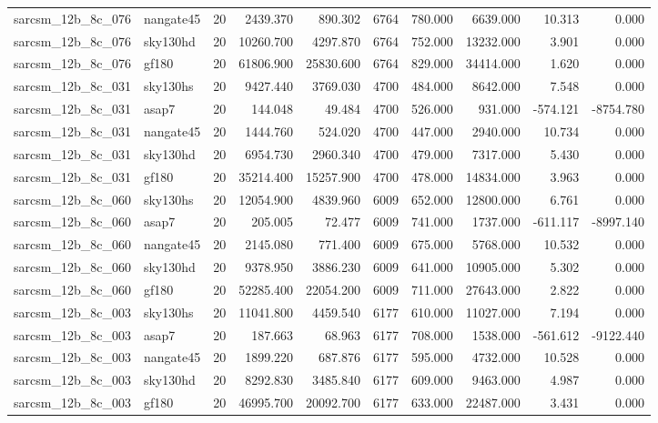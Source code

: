 \documentclass{article}
\begin{document}
\begin{longtable}{llrrrrrrrr}
sarcsm\_12b\_8c\_076 & nangate45 & 20 & 2439.370 & 890.302 & 6764 & 780.000 & 6639.000 & 10.313 & 0.000 \\
sarcsm\_12b\_8c\_076 & sky130hd & 20 & 10260.700 & 4297.870 & 6764 & 752.000 & 13232.000 & 3.901 & 0.000 \\
sarcsm\_12b\_8c\_076 & gf180 & 20 & 61806.900 & 25830.600 & 6764 & 829.000 & 34414.000 & 1.620 & 0.000 \\
sarcsm\_12b\_8c\_031 & sky130hs & 20 & 9427.440 & 3769.030 & 4700 & 484.000 & 8642.000 & 7.548 & 0.000 \\
sarcsm\_12b\_8c\_031 & asap7 & 20 & 144.048 & 49.484 & 4700 & 526.000 & 931.000 & -574.121 & -8754.780 \\
sarcsm\_12b\_8c\_031 & nangate45 & 20 & 1444.760 & 524.020 & 4700 & 447.000 & 2940.000 & 10.734 & 0.000 \\
sarcsm\_12b\_8c\_031 & sky130hd & 20 & 6954.730 & 2960.340 & 4700 & 479.000 & 7317.000 & 5.430 & 0.000 \\
sarcsm\_12b\_8c\_031 & gf180 & 20 & 35214.400 & 15257.900 & 4700 & 478.000 & 14834.000 & 3.963 & 0.000 \\
sarcsm\_12b\_8c\_060 & sky130hs & 20 & 12054.900 & 4839.960 & 6009 & 652.000 & 12800.000 & 6.761 & 0.000 \\
sarcsm\_12b\_8c\_060 & asap7 & 20 & 205.005 & 72.477 & 6009 & 741.000 & 1737.000 & -611.117 & -8997.140 \\
sarcsm\_12b\_8c\_060 & nangate45 & 20 & 2145.080 & 771.400 & 6009 & 675.000 & 5768.000 & 10.532 & 0.000 \\
sarcsm\_12b\_8c\_060 & sky130hd & 20 & 9378.950 & 3886.230 & 6009 & 641.000 & 10905.000 & 5.302 & 0.000 \\
sarcsm\_12b\_8c\_060 & gf180 & 20 & 52285.400 & 22054.200 & 6009 & 711.000 & 27643.000 & 2.822 & 0.000 \\
sarcsm\_12b\_8c\_003 & sky130hs & 20 & 11041.800 & 4459.540 & 6177 & 610.000 & 11027.000 & 7.194 & 0.000 \\
sarcsm\_12b\_8c\_003 & asap7 & 20 & 187.663 & 68.963 & 6177 & 708.000 & 1538.000 & -561.612 & -9122.440 \\
sarcsm\_12b\_8c\_003 & nangate45 & 20 & 1899.220 & 687.876 & 6177 & 595.000 & 4732.000 & 10.528 & 0.000 \\
sarcsm\_12b\_8c\_003 & sky130hd & 20 & 8292.830 & 3485.840 & 6177 & 609.000 & 9463.000 & 4.987 & 0.000 \\
sarcsm\_12b\_8c\_003 & gf180 & 20 & 46995.700 & 20092.700 & 6177 & 633.000 & 22487.000 & 3.431 & 0.000 \\

\end{longtable}
\end{document}
